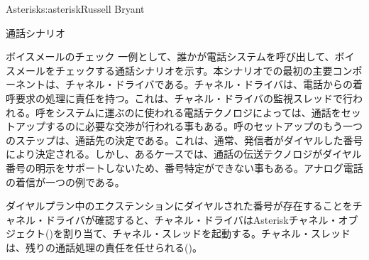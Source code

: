 \begin{aosachapter}{Asterisk}{s:asterisk}{Russell Bryant}
\begin{aosasect1}{通話シナリオ}
\begin{aosasect2}{ボイスメールのチェック}
一例として、誰かが電話システムを呼び出して、ボイスメールをチェックする通話シナリオを示す。本シナリオでの最初の主要コンポーネントは、チャネル・ドライバである。チャネル・ドライバは、電話からの着呼要求の処理に責任を持つ。これは、チャネル・ドライバの監視スレッドで行われる。呼をシステムに運ぶのに使われる電話テクノロジによっては、通話をセットアップするのに必要な交渉が行われる事もある。呼のセットアップのもう一つのステップは、通話先の決定である。これは、通常、発信者がダイヤルした番号により決定される。しかし、あるケースでは、通話の伝送テクノロジがダイヤル番号の明示をサポートしないため、番号特定ができない事もある。アナログ電話の着信が一つの例である。

ダイヤルプラン中のエクステンションにダイヤルされた番号が存在することをチャネル・ドライバが確認すると、チャネル・ドライバはAsteriskチャネル・オブジェクト()を割り当て、チャネル・スレッドを起動する。チャネル・スレッドは、残りの通話処理の責任を任せられる()。



\end{aosasect2}
\end{aosasect1}
\end{aosachapter}
